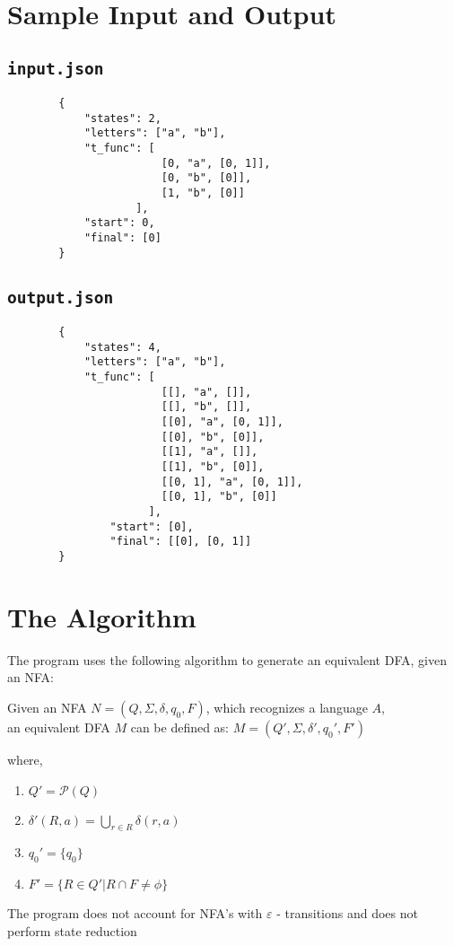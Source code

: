 \documentclass[12pt]{scrreprt}
\begin{document}
    \section{Sample Input and Output}
    \subsection*{\texttt{input.json}}
    \begin{verbatim}
        {
            "states": 2,
            "letters": ["a", "b"],
            "t_func": [
                        [0, "a", [0, 1]],
                        [0, "b", [0]],
                        [1, "b", [0]]
                    ],
            "start": 0,
            "final": [0]
        }
    \end{verbatim}

    \subsection*{\texttt{output.json}}
    \begin{verbatim}
        {
            "states": 4,
            "letters": ["a", "b"],
            "t_func": [
                        [[], "a", []],
                        [[], "b", []],
                        [[0], "a", [0, 1]],
                        [[0], "b", [0]],
                        [[1], "a", []],
                        [[1], "b", [0]],
                        [[0, 1], "a", [0, 1]],
                        [[0, 1], "b", [0]]
                      ],
                "start": [0],
                "final": [[0], [0, 1]]
        }
    \end{verbatim}

    \section{The Algorithm}
    The program uses the following algorithm to generate an equivalent DFA, given an NFA:
    \begin{center}
        Given an NFA $ N = (Q, \Sigma, \delta, q_0, F ) $, which recognizes a language $A$,\\
         an equivalent DFA $M$ can be defined as:
        $ M = (Q', \Sigma, \delta', q_0', F') $ 
    \end{center}
    where,
    \begin{enumerate}
        \item $ Q' = \mathcal{P} (Q) $
        \item $ \delta'(R,a) = \bigcup\limits_{r \in R} \delta(r,a) $
        \item $ q_0' = \{q_0\} $
        \item $ F' = \{ R \in Q' | R \cap F \neq \phi  \} $
    \end{enumerate}
    The program does not account for NFA's with $ \varepsilon $ - transitions and does not perform state reduction
\end{document}
